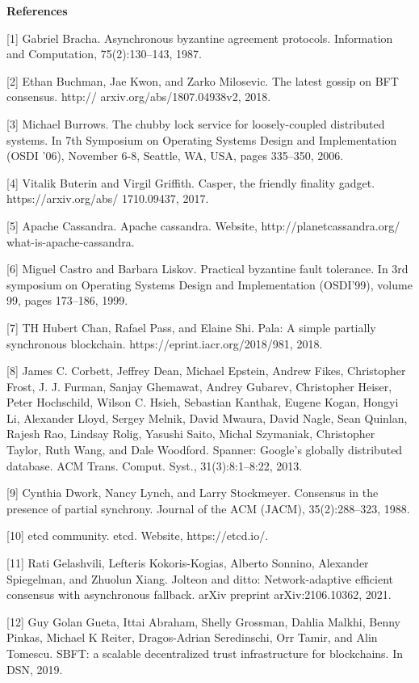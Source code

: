 


\Large\textbf{References}\normalsize


[1]	Gabriel Bracha. Asynchronous byzantine agreement protocols. Information and Computation, 75(2):130–143, 1987.

[2]	Ethan Buchman, Jae Kwon, and Zarko Milosevic. The latest gossip on BFT consensus. http:// arxiv.org/abs/1807.04938v2, 2018.

[3]	Michael Burrows. The chubby lock service for loosely-coupled distributed systems. In 7th Symposium on Operating Systems Design and Implementation (OSDI ’06), November 6-8, Seattle, WA, USA, pages 335–350, 2006.

[4]	Vitalik Buterin and Virgil Griffith. Casper, the friendly finality gadget. https://arxiv.org/abs/ 1710.09437, 2017.

[5]	Apache	Cassandra.	Apache	cassandra.	Website, http://planetcassandra.org/ what-is-apache-cassandra.

[6]	Miguel Castro and Barbara Liskov. Practical byzantine fault tolerance. In 3rd symposium on Operating Systems Design and Implementation (OSDI’99), volume 99, pages 173–186, 1999.

[7]	TH Hubert Chan, Rafael Pass, and Elaine Shi. Pala: A simple partially synchronous blockchain. https://eprint.iacr.org/2018/981, 2018.

[8]	James C. Corbett, Jeffrey Dean, Michael Epstein, Andrew Fikes, Christopher Frost, J. J. Furman,
Sanjay Ghemawat, Andrey Gubarev, Christopher Heiser, Peter Hochschild, Wilson C. Hsieh, Sebastian Kanthak, Eugene Kogan, Hongyi Li, Alexander Lloyd, Sergey Melnik, David Mwaura, David Nagle, Sean Quinlan, Rajesh Rao, Lindsay Rolig, Yasushi Saito, Michal Szymaniak, Christopher Taylor, Ruth Wang, and Dale Woodford. Spanner: Google’s globally distributed database. ACM Trans. Comput. Syst., 31(3):8:1–8:22, 2013.

[9]	Cynthia Dwork, Nancy Lynch, and Larry Stockmeyer. Consensus in the presence of partial synchrony. Journal of the ACM (JACM), 35(2):288–323, 1988.

[10]	etcd community. etcd. Website, https://etcd.io/.

[11]	Rati Gelashvili, Lefteris Kokoris-Kogias, Alberto Sonnino, Alexander Spiegelman, and Zhuolun Xiang. Jolteon and ditto: Network-adaptive efficient consensus with asynchronous fallback. arXiv preprint arXiv:2106.10362, 2021.

[12]	Guy Golan Gueta, Ittai Abraham, Shelly Grossman, Dahlia Malkhi, Benny Pinkas, Michael K Reiter, Dragos-Adrian Seredinschi, Orr Tamir, and Alin Tomescu. SBFT: a scalable decentralized trust infrastructure for blockchains. In DSN, 2019.

